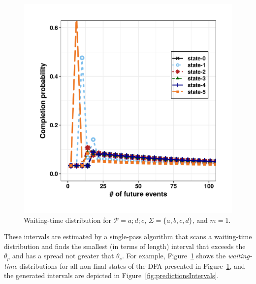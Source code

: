 \begin{figure}[H]
	\begin{centering}
		\center
		\includegraphics[width=\textwidth,keepaspectratio]{chapters/figures/new_wt.png}
		
		
		\caption{Waiting-time distribution for
			$\mathcal{P}=a ; d ; c$, $\Sigma=\{a,b,c,d\}$, and $m=1$.}
		\label{fig:wt1}
	\end{centering}
\end{figure}

\par These intervals are estimated by a single-pass algorithm that scans a waiting-time distribution and finds the smallest (in terms of length) interval that exceeds the $\theta_{p}$ and has a spread  not greater that $\theta_{s}$. For example, Figure~\ref{fig:wt1} shows the \textit{waiting-time} distributions for all non-final states of the DFA presented in Figure~\ref{fig:wt1}, and the generated intervals are depicted in Figure~\ref{fig:predictionsIntervals}.


